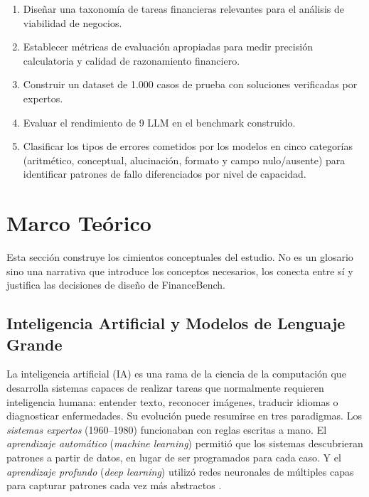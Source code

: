\documentclass[12pt,a4paper]{article}
\begin{document}
\begin{enumerate}
  \item Diseñar una taxonomía de tareas financieras relevantes para el análisis de viabilidad de negocios.
  \item Establecer métricas de evaluación apropiadas para medir precisión calculatoria y calidad de razonamiento financiero.
  \item Construir un dataset de 1.000 casos de prueba con soluciones verificadas por expertos.
  \item Evaluar el rendimiento de 9 LLM en el benchmark construido.
  \item Clasificar los tipos de errores cometidos por los modelos en cinco categorías (aritmético, conceptual, alucinación, formato y campo nulo/ausente) para identificar patrones de fallo diferenciados por nivel de capacidad.
\end{enumerate}

\section{Marco Teórico}\label{sec:marco}

Esta sección construye los cimientos conceptuales del estudio. No es un glosario sino una narrativa que introduce los conceptos necesarios, los conecta entre sí y justifica las decisiones de diseño de FinanceBench.

\subsection{Inteligencia Artificial y Modelos de Lenguaje Grande}

La inteligencia artificial (IA) es una rama de la ciencia de la computación que desarrolla sistemas capaces de realizar tareas que normalmente requieren inteligencia humana: entender texto, reconocer imágenes, traducir idiomas o diagnosticar enfermedades. Su evolución puede resumirse en tres paradigmas. Los \textit{sistemas expertos} (1960--1980) funcionaban con reglas escritas a mano. El \textit{aprendizaje automático} (\textit{machine learning}) permitió que los sistemas descubrieran patrones a partir de datos, en lugar de ser programados para cada caso. Y el \textit{aprendizaje profundo} (\textit{deep learning}) utilizó redes neuronales de múltiples capas para capturar patrones cada vez más abstractos \citep{LeCun2015}.
\end{document}

